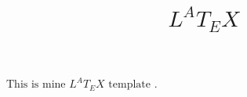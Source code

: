 \documentclass{article}
\begin{document}
	\title{\(L^AT_EX\)}
	\date{}
	\maketitle
	\(\text{This is mine } L^AT_EX \text{ template}\) . 
\end{document}
